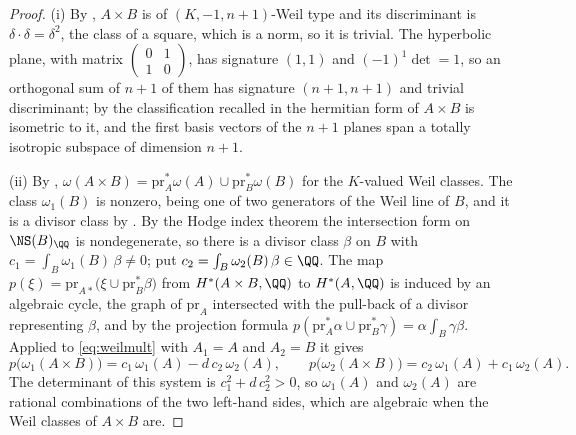 \begin{proof}
(i) By , $A\times B$ is of $(K,-1,n+1)$-Weil type and its
discriminant is $\delta\cdot\delta=\delta^{2}$, the class of a square, which
is a norm, so it is trivial. The hyperbolic plane, with matrix
$\left(\begin{smallmatrix}0&1\\1&0\end{smallmatrix}\right)$, has signature
$(1,1)$ and $(-1)^{1}\det=1$, so an orthogonal sum of $n+1$ of them has
signature $(n+1,n+1)$ and trivial discriminant; by the classification
recalled in  the hermitian form of $A\times B$ is isometric
to it, and the first basis vectors of the $n+1$ planes span a totally
isotropic subspace of dimension $n+1$.

(ii) By ,
$\omega(A\times B)=\mathrm{pr}_{A}^{*}\omega(A)\cup\mathrm{pr}_{B}^{*}\omega(B)$
for the $K$-valued Weil classes. The class $\omega_{1}(B)$ is nonzero, being
one of two generators of the Weil line of $B$, and it is a divisor class by
. By the Hodge index theorem the intersection form on
$\NS(B)_{\QQ}$ is nondegenerate, so there is a divisor class $\beta$ on $B$
with $c_{1}=\int_{B}\omega_{1}(B)\,\beta\ne0$; put
$c_{2}=\int_{B}\omega_{2}(B)\,\beta\in\QQ$. The map
$p(\xi)=\mathrm{pr}_{A*}\bigl(\xi\cup\mathrm{pr}_{B}^{*}\beta\bigr)$ from
$H^{*}(A\times B,\QQ)$ to $H^{*}(A,\QQ)$ is induced by an algebraic cycle,
the graph of $\mathrm{pr}_{A}$ intersected with the pull-back of a divisor
representing $\beta$, and by the projection formula
$p(\mathrm{pr}_{A}^{*}\alpha\cup\mathrm{pr}_{B}^{*}\gamma)=\alpha\int_{B}
\gamma\beta$. Applied to \eqref{eq:weilmult} with $A_{1}=A$ and $A_{2}=B$ it
gives
\[
  p\bigl(\omega_{1}(A\times B)\bigr)=c_{1}\,\omega_{1}(A)-d\,c_{2}\,\omega_{2}(A),
  \qquad
  p\bigl(\omega_{2}(A\times B)\bigr)=c_{2}\,\omega_{1}(A)+c_{1}\,\omega_{2}(A).
\]
The determinant of this system is $c_{1}^{2}+d\,c_{2}^{2}>0$, so
$\omega_{1}(A)$ and $\omega_{2}(A)$ are rational combinations of the two
left-hand sides, which are algebraic when the Weil classes of $A\times B$
are.
\end{proof}

